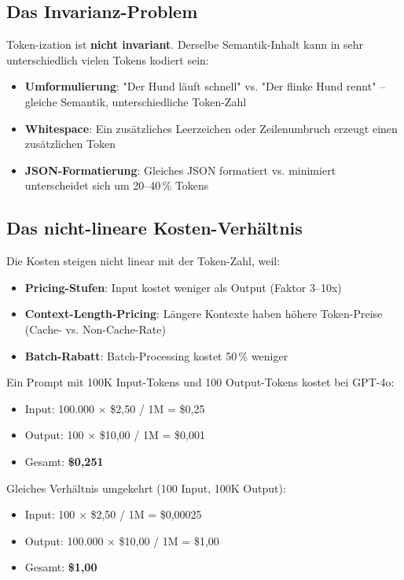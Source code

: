 \subsection{Das Invarianz-Problem}

Token-ization ist \textbf{nicht invariant}. Derselbe Semantik-Inhalt kann in sehr unterschiedlich vielen Tokens kodiert sein:

\begin{itemize}[leftmargin=*]
    \item \textbf{Umformulierung}: "Der Hund läuft schnell" vs. "Der flinke Hund rennt" -- gleiche Semantik, unterschiedliche Token-Zahl
    \item \textbf{Whitespace}: Ein zusätzliches Leerzeichen oder Zeilenumbruch erzeugt einen zusätzlichen Token
    \item \textbf{JSON-Formatierung}: Gleiches JSON formatiert vs. minimiert unterscheidet sich um 20--40\,\% Tokens
\end{itemize}

\subsection{Das nicht-lineare Kosten-Verhältnis}

Die Kosten steigen nicht linear mit der Token-Zahl, weil:
\begin{itemize}[leftmargin=*]
    \item \textbf{Pricing-Stufen}: Input kostet weniger als Output (Faktor 3--10x)
    \item \textbf{Context-Length-Pricing}: Längere Kontexte haben höhere Token-Preise (Cache- vs. Non-Cache-Rate)
    \item \textbf{Batch-Rabatt}: Batch-Processing kostet 50\,\% weniger
\end{itemize}

Ein Prompt mit 100K Input-Tokens und 100 Output-Tokens kostet bei GPT-4o:
\begin{itemize}[leftmargin=*]
    \item Input: 100.000 $\times$ \$2,50 / 1M = \$0,25
    \item Output: 100 $\times$ \$10,00 / 1M = \$0,001
    \item Gesamt: \textbf{\$0,251}
\end{itemize}

Gleiches Verhältnis umgekehrt (100 Input, 100K Output):
\begin{itemize}[leftmargin=*]
    \item Input: 100 $\times$ \$2,50 / 1M = \$0,00025
    \item Output: 100.000 $\times$ \$10,00 / 1M = \$1,00
    \item Gesamt: \textbf{\$1,00}
\end{itemize}

